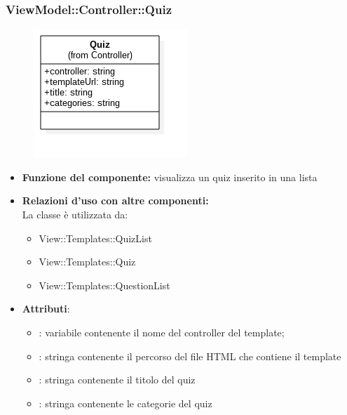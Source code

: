 \subsubsection{ViewModel::Controller::Quiz}
\begin{figure}[h!]
\begin{center}
	\includegraphics[scale=0.6]{../images/ViewModel/Controller/Quiz.png}
\end{center}
\end{figure}
\begin{itemize}
\item\textbf{Funzione del componente:} visualizza un quiz inserito in una lista
				\item\textbf{Relazioni d'uso con altre componenti:}\\
 La classe è utilizzata da:
 	\begin{itemize}
 		\item View::Templates::QuizList
 		\item View::Templates::Quiz
 		\item View::Templates::QuestionList
 	\end{itemize}
 \item\textbf{Attributi}:
 	\begin{itemize}
 		\item{}: variabile contenente il nome del controller del template;\\
		
		\item{}: stringa contenente il percorso del file HTML che contiene il template\\
		\item{}: stringa contenente il titolo del quiz
		\item{}: stringa contenente le categorie del quiz
 	\end{itemize}
 \end{itemize}
\newpage

